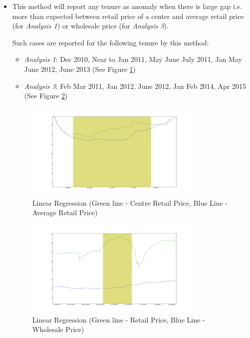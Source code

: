 \documentclass[a4paper,10pt]{report}
\begin{document}
		\begin{itemize}
			\item This method will report any tenure as anomaly when there is large gap i.e. more than expected between retail price of a center and average retail price (for \textit{Analysis 1}) or wholesale price (for \textit{Analysis 3}).
			
			
			
			Such cases are reported for the following tenure by this method:
			\begin{itemize}
				\item \textit{Analysis 1}: Dec 2010, Near to Jan 2011, May June July 2011, Jan May June 2012, June 2013 (See Figure \ref{fig:12211})
				\item \textit{Analysis 3}: Feb Mar 2011, Jan 2012, June 2012, Jan Feb 2014, Apr 2015 (See Figure \ref{fig:12231})
			\end{itemize}
			\begin{figure}[H]
		    	\centering
  		    	\includegraphics[width=0.8\textwidth]{graphs/12211.png}
		    	\caption{Linear Regression (Green line - Centre Retail Price, Blue Line - Average Retail Price)}
		    	\label{fig:12211}
			\end{figure}
			
			\begin{figure}[H]
		    	\centering
  		    	\includegraphics[width=0.8\textwidth]{graphs/12231.png}
		    	\caption{Linear Regression (Green line - Retail Price, Blue Line - Wholesale Price)}
		    	\label{fig:12231}
			\end{figure}
			

\end{itemize}
\end{document}
